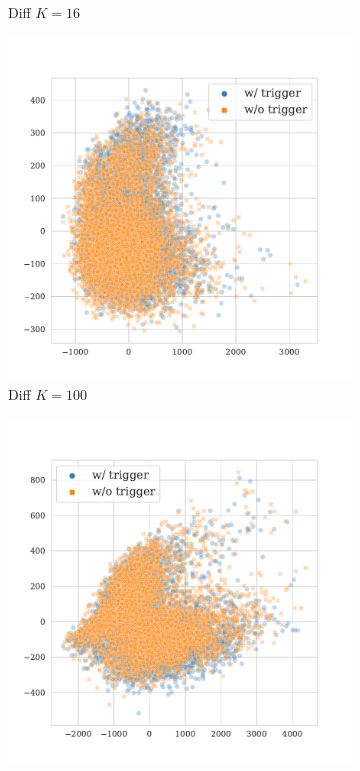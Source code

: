 \begin{figure}[!ht]
\begin{subfigure}{.33\textwidth}
  \caption{Diff $K = 16$}
  \label{fig:qnli_diff_k16_embed}
\end{subfigure}%
\begin{subfigure}{.33\textwidth}
  \centering
  \includegraphics[width=\linewidth]{figures/evaluation_media/qnli-roberta-large-visual-backdoor-diff-prompt-k100-seed42-poison-cf-175.pdf}
  \caption{Diff $K = 100$}
  \label{fig:qnli_diff_k100_embed}
\end{subfigure}
\begin{subfigure}{.33\textwidth}
  \centering
  \includegraphics[width=\linewidth]{figures/evaluation_media/qnli-roberta-large-visual-backdoor-diff-prompt-k1000-seed42-poison-cf-1712.pdf}

\end{subfigure}
\end{figure}
